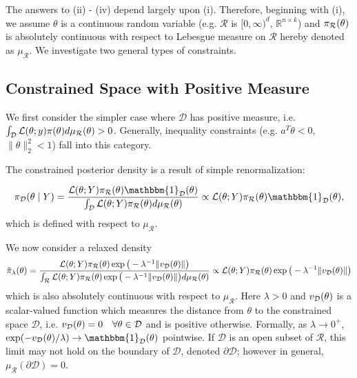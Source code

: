 \documentclass[10pt,fleqn]{article} \pdfoutput=1
\DeclareMathOperator{\1}{\mathbbm{1}} \DeclareMathOperator{\bigO}{\mc O}
\begin{document}
The answers to (ii) - (iv) depend largely upon (i).  Therefore, beginning with
(i), we assume $\theta$ is a continuous random variable (e.g.  $\mathcal{R}$
is $[0,\infty)^d$, $\mathbb{R}^{n\times k}$) and  $\pi_{\mathcal{R}}(\theta)$ is
absolutely continuous with respect to Lebesgue measure on $\mathcal{R}$ hereby
denoted as $\mu_\mathcal{R}$. We investigate two general types of constraints.

\subsection{Constrained Space with Positive Measure}
\label{SEC:Positive_measure_methods}

We first consider the simpler case where $\mathcal{D}$ has positive measure,
i.e.  $\int_\mathcal{D} {\mathcal{L}}(\theta;y)\pi(\theta)d\mu_\mathcal{R}(\theta)
>0$.  Generally, inequality constraints (e.g.  $a^T\theta
< 0$, $\|\theta\|_2^2 < 1$) fall into this category.

The constrained posterior density is a result of simple
renormalization:

$$\pi_\mathcal{D}(\theta\mid Y) = \frac{\mathcal{L}(\theta; Y)
\pi_\mathcal{R}(\theta)\mathbbm{1}_\mathcal{D}(\theta)}{\int_\mathcal{D}
\mathcal{L}(\theta; Y)
\pi_\mathcal{R}(\theta)d\mu_\mathcal{R}(\theta)}\propto \mathcal{L}(\theta;
Y) \pi_\mathcal{R}(\theta)\mathbbm{1}_\mathcal{D}(\theta), $$
which is defined with respect to $\mu_\mathcal{R}$.

We now consider a relaxed density
\begin{equation}
\label{EQ:relaxedDensityPosMeasure}
\tilde{\pi}_\lambda(\theta) =
\frac{\mathcal{L}(\theta;
Y)\pi_\mathcal{R}(\theta)\exp\big(-
\lambda^{-1}{\|v_{\mathcal{D}}(\theta)\|}\big)}{\int_{\mathcal{R}}\mathcal{L}(\theta; Y)
\pi_\mathcal{R}(\theta)\exp\big(-{\lambda^{-1}}{\|v_{\mathcal{D}}(\theta)\|}\big)
d\mu_\mathcal{R}(\theta)} \propto
\mathcal{L}(\theta; Y)
\pi_\mathcal{R}(\theta)\exp\big(-{\lambda^{-1}}{\|v_{\mathcal{D}}(\theta)\|}\big)
\end{equation}
which is also absolutely continuous with respect to $\mu_\mathcal{R}.$
Here $\lambda >0$ and $v_{\mathcal{D}}(\theta)$ is a scalar-valued function which measures
the distance
from $\theta$ to the constrained space $\mathcal{D}$, i.e.  $v_{\mathcal{D}}(\theta) = 0 \quad \forall \theta \in \mathcal{D}$
and is
positive otherwise.  Formally, as $\lambda \to 0^+$, $\exp(-v_{\mc
D}(\theta)/\lambda) \to \mathbbm{1}_\mathcal{D}(\theta)$ pointwise.
If $\mathcal{D}$ is an open subset of $\mathcal{R}$, this limit may not hold
on the boundary of $\mathcal{D}$, denoted $\partial
\mathcal{D}$; however in general, $\mu_\mathcal{R}(\partial
\mathcal{D}) = 0$.
\end{document}
